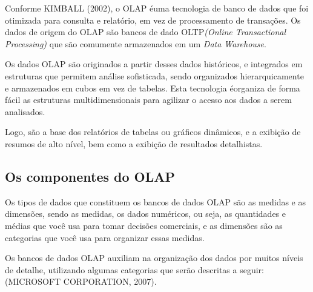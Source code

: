Conforme KIMBALL (2002), o OLAP \'{e}uma tecnologia de banco de dados que foi otimizada para consulta e relatório, em vez de processamento de transações. Os dados de origem do OLAP são bancos de dado OLTP\textit{(Online Transactional Processing)} que são comumente armazenados em um \textit{Data Warehouse}.

Os dados OLAP são originados a partir desses dados históricos, e integrados em estruturas que permitem análise sofisticada, sendo organizados hierarquicamente e armazenados em cubos em vez de tabelas. Esta tecnologia \'{e}organiza de forma fácil as estruturas multidimensionais para agilizar o acesso aos dados a serem analisados. 

Logo, s\~{a}o a base dos relatórios de tabelas ou gráficos dinâmicos, e a exibição de resumos de alto nível, bem como a exibição de resultados detalhistas.

\subsection{Os componentes do OLAP}

Os tipos de dados que constituem os bancos de dados OLAP são as medidas e as dimensões, sendo as medidas, os dados numéricos, ou seja, as quantidades e médias que você usa para tomar decisões comerciais, e as dimensões s\~{a}o as categorias que você usa para organizar essas medidas.

Os bancos de dados OLAP auxiliam na organização dos dados por muitos níveis de detalhe, utilizando algumas categorias que serão descritas a seguir: (MICROSOFT CORPORATION, 2007).

